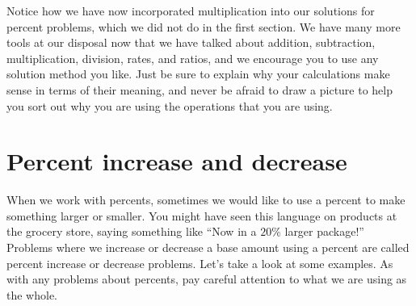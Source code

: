 \documentclass{ximera}
\begin{document}
Notice how we have now incorporated multiplication into our solutions for percent problems, which we did not do in the first section. We have many more tools at our disposal now that we have talked about addition, subtraction, multiplication, division, rates, and ratios, and we encourage you to use any solution method you like. Just be sure to explain why your calculations make sense in terms of their meaning, and never be afraid to draw a picture to help you sort out why you are using the operations that you are using.



\section{Percent increase and decrease}

When we work with percents, sometimes we would like to use a percent to make something larger or smaller. You might have seen this language on products at the grocery store, saying something like ``Now in a $20\%$ larger package!'' Problems where we increase or decrease a base amount using a percent are called percent increase or decrease problems. Let's take a look at some examples. As with any problems about percents, pay careful attention to what we are using as the whole. 
\end{document}
